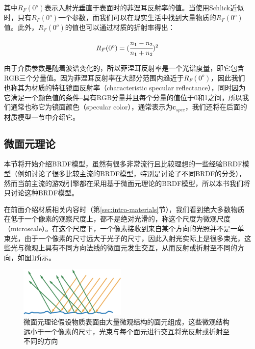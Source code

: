 其中$R_F(0^o)$表示入射光垂直于表面时的菲涅耳反射率的值。当使用Schlick近似时，只有$R_F(0^o)$一个参数，而我们可以在现实生活中找到大量物质的$R_F(0^o)$值。此外，$R_F(0^o)$的值也可以通过材质的折射率得出：

\begin{equation}
	R_F(0^o)=( \cfrac{n_1-n_2}{n_1+n_2})^2
\end{equation}

\noindent 由于介质参数是随着波谱变化的，所以菲涅耳反射率是一个光谱度量，即它包含RGB三个分量值。因为菲涅耳反射率在大部分范围内趋近于$R_F(0^o)$，因此我们也称其为材质的特征镜面反射率（characteristic specular reflectance），同时因为它满足一个颜色值的条件--具有RGB分量并且每个分量的值位于0和1之间，所以我们通常也称它为镜面颜色（specular color），通常表示为$\mathbf{c}_{spec}$，我们还将在后面的材质模型一节中介绍它。




\subsection{微面元理论}
本节将开始介绍BRDF模型，虽然有很多非常流行且比较理想的一些经验BRDF模型（例如\cite{a:AComparisonofFourBRDFModels,a:ExperimentalAnalysisofBRDFModels,a:AnOverviewofBRDFModels}讨论了很多比较主流的BRDF模型，特别是\cite{a:AnOverviewofBRDFModels}讨论了不同BRDF的分类），然而当前主流的游戏引擎\cite{a:RealShadinginUnrealEngine4,a:MovingFrostbitetoPBR,a:PhysicallyBasedShadingatDisney,a:PhysicallyBasedShadinginUnity}都在采用基于微面元理论的BRDF模型，所以本书我们将只讨论这种BRDF模型。

在前面介绍材质相关内容时（第\ref{sec:intro-materials}节），我们看到绝大多数物质在低于一个像素的观察尺度上，都不是绝对光滑的，称这个尺度为微观尺度（microscale）。在这个尺度下，一个像素接收到来自某个方向的光照并不是一单束光，由于一个像素的尺寸远大于光子的尺寸，因此入射光实际上是很多束光，这些光与微观上具有不同方向法线的微面元发生交互，从而反射或折射至不同的方向，如图\ref{f:intro-microgeometry}所示。

\begin{figure}
	\sidecaption
	\includegraphics[width=0.47\textwidth]{figures/intro/ray-optics-3}
	\caption{微面元理论假设物质表面由大量微观结构的面元组成，这些微观结构远小于一个像素的尺寸，光束与每个面元进行交互将光反射或折射至不同的方向}
	\label{f:intro-microgeometry}
\end{figure}


